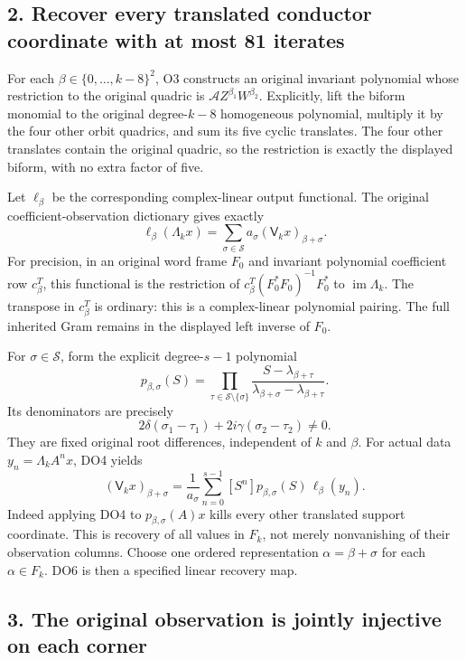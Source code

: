 \documentclass[11pt]{article}
\begin{document}
\subsection{2. Recover every translated conductor coordinate with at most 81 iterates}\label{recover-every-translated-conductor-coordinate-with-at-most-81-iterates}

For each \(\beta\in\{0,\ldots,k-8\}^2\), O3 constructs an original invariant polynomial whose restriction to the original quadric is \(\mathcal A Z^{\beta_1}W^{\beta_2}\). Explicitly, lift the biform monomial to the original degree-\(k-8\) homogeneous polynomial, multiply it by the four other orbit quadrics, and sum its five cyclic translates. The four other translates contain the original quadric, so the restriction is exactly the displayed biform, with no extra factor of five.

Let \(\ell_\beta\) be the corresponding complex-linear output functional. The original coefficient-observation dictionary gives exactly \[
\ell_\beta(\Lambda_k x)=
\sum_{\sigma\in\mathcal S}a_\sigma
(\mathsf V_kx)_{\beta+\sigma}.
\tag{DO4}
\] For precision, in an original word frame \(F_0\) and invariant polynomial coefficient row \(c_\beta^T\), this functional is the restriction of \(c_\beta^T(F_0^*F_0)^{-1}F_0^*\) to \(\operatorname{im}\Lambda_k\). The transpose in \(c_\beta^T\) is ordinary: this is a complex-linear polynomial pairing. The full inherited Gram remains in the displayed left inverse of \(F_0\).

For \(\sigma\in\mathcal S\), form the explicit degree-\(s-1\) polynomial \[
\boxed{\displaystyle
p_{\beta,\sigma}(S)=
\prod_{\tau\in\mathcal S\setminus\{\sigma\}}
\frac{S-\lambda_{\beta+\tau}}
{\lambda_{\beta+\sigma}-\lambda_{\beta+\tau}}.}
\tag{DO5}
\] Its denominators are precisely \[
2\delta(\sigma_1-\tau_1)+2i\gamma(\sigma_2-\tau_2)\ne0.
\] They are fixed original root differences, independent of \(k\) and \(\beta\). For actual data \(y_n=\Lambda_k A^n x\), DO4 yields \[
\boxed{\displaystyle
(\mathsf V_kx)_{\beta+\sigma}
=\frac1{a_\sigma}\sum_{n=0}^{s-1}
[S^n]p_{\beta,\sigma}(S)\,\ell_\beta(y_n).}
\tag{DO6}
\] Indeed applying DO4 to \(p_{\beta,\sigma}(A)x\) kills every other translated support coordinate. This is recovery of all values in \(F_k\), not merely nonvanishing of their observation columns. Choose one ordered representation \(\alpha=\beta+\sigma\) for each \(\alpha\in F_k\). DO6 is then a specified linear recovery map.

\subsection{3. The original observation is jointly injective on each corner}\label{the-original-observation-is-jointly-injective-on-each-corner}
\end{document}
